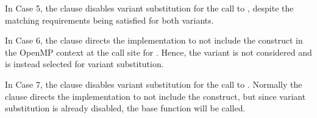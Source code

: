 In Case 5, the  clause disables variant
substitution for the call to , despite the matching requirements
being satisfied for both variants.

In Case 6, the   clause directs the implementation to not
include the  construct in the OpenMP context at the call site
for . Hence, the  variant is not considered
and  is instead selected for variant substitution.

In Case 7, the  clause disables variant
substitution for the call to . Normally the   clause 
directs the implementation to not include the  construct, but since 
variant substitution is already disabled, the base function  will be 
called.

